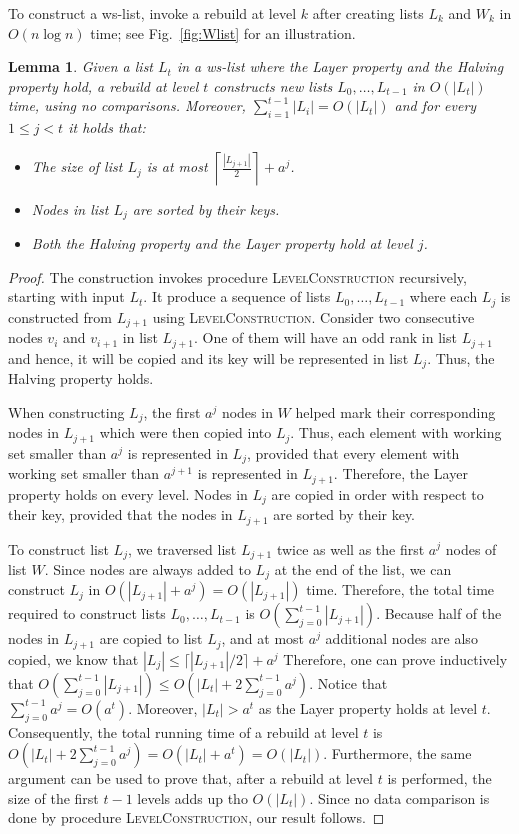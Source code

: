 \documentclass[11pt]{article}       %
\newtheorem{lemma}{Lemma}
\newcommand{\wlist}{ws-list\xspace}
\newcommand{\halving}{Halving property\xspace}
\newcommand{\layer}{Layer property\xspace}
\begin{document}
To construct a \wlist, invoke a rebuild at level $k$ after creating lists $L_k$ and $W_k$ in $O(n\log n)$ time; see Fig.~\ref{fig:Wlist} for an illustration.

\pagebreak
\begin{lemma}\label{lemma:Properties of Level rebuild}
Given a list $L_t$ in a \wlist where the \layer and the \halving hold, a rebuild at level $t$ constructs new lists $L_0, \ldots, L_{t-1}$ in $O(|L_t|)$ time, using no comparisons. Moreover, $\sum_{i=1}^{t-1} |L_i| = O(|L_t|)$ and for every $1\leq j < t$ it holds that:
\begin{itemize}
\item The size of list $L_j$ is at most $\left\lceil\frac{|L_{j+1}|}{2}\right \rceil + a^j$.
\item Nodes in list $L_j$ are sorted by their keys.
\item Both the \halving and the \layer hold at level $j$.
\end{itemize}
\end{lemma}
\begin{proof}
The construction invokes procedure \textsc{LevelConstruction} recursively, starting with input $L_t$. 
It produce a sequence of lists $L_0, \ldots, L_{t-1}$ where each $L_j$ is constructed from $L_{j+1}$ using \textsc{LevelConstruction}. 
Consider two consecutive nodes $v_i$ and $v_{i+1}$ in list $L_{j+1}$. 
One of them will have an odd rank in list $L_{j+1}$ and hence, it will be copied and its key will be represented in list $L_j$. 
Thus, the \halving holds.

When constructing $L_j$, the first $a^{j}$ nodes in $W$ helped mark their corresponding nodes in $L_{j+1}$ which were then copied into $L_j$. 
Thus, each element with working set smaller than $a^j$ is represented in $L_j$, provided that every element with working set smaller than $a^{j+1}$ is represented in $L_{j+1}$. Therefore, the \layer holds on every level.
Nodes in $L_j$  are copied in order with respect to their key, provided that the nodes in $L_{j+1}$ are sorted by their key. 

To construct list $L_j$, we traversed list $L_{j+1}$ twice as well as the first $a^j$ nodes of list $W$. 
Since nodes are always added to $L_j$ at the end of the list, we can construct $L_j$ in $O(|L_{j+1}| + a^j) = O(|L_{j+1}|)$ time.
Therefore, the total time required to construct lists $L_0, \ldots, L_{t-1}$ is $O(\sum_{j=0}^{t-1} |L_{j+1}|)$.
Because half of the nodes in $L_{j+1}$ are copied to list $L_j$, and at most $a^j$ additional nodes are also copied, we know that $|L_j| \leq \lceil |L_{j+1}|/2\rceil + a^j$
Therefore, one can prove inductively that $O(\sum_{j=0}^{t-1} |L_{j+1}|) \leq O(|L_t| + 2\sum_{j=0}^{t-1} a^j)$.
Notice that $\sum_{j=0}^{t-1} a^j = O(a^t)$. Moreover, $|L_t| > a^t$ as the \layer holds at level $t$.
Consequently, the total running time of a rebuild at level $t$ is $O(|L_t| + 2\sum_{j=0}^{t-1} a^j) = O(|L_t| + a^t) = O(|L_t|)$.
Furthermore, the same argument can be used to prove that, after a rebuild at level $t$ is performed, the size of the first $t-1$ levels adds up tho $O(|L_t|)$.
Since no data comparison is done by procedure \textsc{LevelConstruction}, our result follows.
\end{proof}
\end{document}

